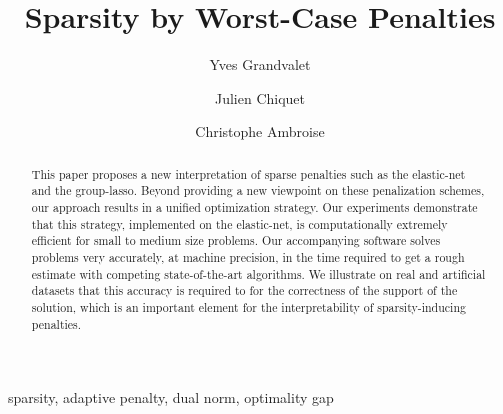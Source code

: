 \documentclass[review,authoryear]{elsarticle}
\begin{document}
\begin{frontmatter}





\title{Sparsity by Worst-Case Penalties}

\author[label1]{Yves Grandvalet}
\author[label2]{Julien Chiquet}
\author[label3]{Christophe Ambroise}
\address[label1]{Sorbonne universit\'es, Universit\'e de technologie de Compi\`egne, CNRS, \\ Heudiasyc UMR 7253, CS 60 319, 60 203 Compi\`egne cedex, France}
\address[label2]{AgroParisTech, INRA, Universit\'e Paris-Saclay\\UMR MIA-Paris, 16 rue Claude Bernard, 75005, Paris, France}
\address[label3]{Universit\'e d'\'Evry Val d'Essonne, Universit\'e Paris-Saclay,  ENSIIE, USC INRA\\ UMR CNRS 8071, LaMME, 91000 \'Evry, France}

\begin{abstract}%
  This paper proposes a new interpretation of sparse penalties such as
  the elastic-net and the group-lasso.  Beyond providing a new
  viewpoint on these penalization schemes, our approach results in a
  unified optimization strategy.  Our experiments demonstrate that
  this strategy, implemented on the elastic-net, is computationally
  extremely efficient for small to medium size problems.  Our
  accompanying software solves problems very accurately, at machine
  precision, in the time required to get a rough estimate with
  competing state-of-the-art algorithms.  We illustrate on real and
  artificial datasets that this accuracy is required to for the
  correctness of the support of the solution, which is an important
  element for the interpretability of sparsity-inducing penalties.
\end{abstract} 

\begin{keyword}
  sparsity, adaptive penalty, dual norm, optimality gap
\end{keyword}

\end{frontmatter}











 



\appendix


\end{document}
